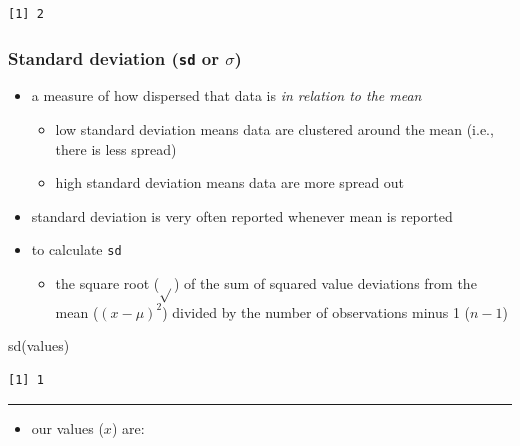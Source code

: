 \documentclass[
  letterpaper,
  DIV=11]{scrartcl}
\newenvironment{Shaded}{\begin{snugshade}}{\end{snugshade}}
\newcommand{\FunctionTok}[1]{\textcolor[rgb]{0.28,0.35,0.67}{#1}}
\newcommand{\NormalTok}[1]{\textcolor[rgb]{0.00,0.23,0.31}{#1}}
\providecommand{\tightlist}{%
  \setlength{\itemsep}{0pt}\setlength{\parskip}{0pt}}\usepackage{longtable,booktabs,array}
\begin{document}
\begin{verbatim}
[1] 2
\end{verbatim}

\hypertarget{standard-deviation-sd-or-sigma}{%
\subsubsection{\texorpdfstring{Standard deviation (\texttt{sd} or
\(\sigma\))}{Standard deviation (sd or \textbackslash sigma)}}\label{standard-deviation-sd-or-sigma}}

\begin{itemize}
\item
  a measure of how dispersed that data is \emph{in relation to the mean}

  \begin{itemize}
  \tightlist
  \item
    low standard deviation means data are clustered around the mean
    (i.e., there is less spread)
  \item
    high standard deviation means data are more spread out
  \end{itemize}
\item
  standard deviation is very often reported whenever mean is reported
\item
  to calculate \texttt{sd}

  \begin{itemize}
  \tightlist
  \item
    the square root (\(\sqrt{}\)) of the sum of squared value deviations
    from the mean (\((x - \mu)^2\)) divided by the number of
    observations minus 1 (\(n-1\))
  \end{itemize}
\end{itemize}

\begin{Shaded}
\begin{Highlighting}[]
\FunctionTok{sd}\NormalTok{(values)}
\end{Highlighting}
\end{Shaded}

\begin{verbatim}
[1] 1
\end{verbatim}

\begin{center}\rule{0.5\linewidth}{0.5pt}\end{center}

\begin{itemize}
\tightlist
\item
  our values (\(x\)) are:
\end{itemize}
\end{document}
